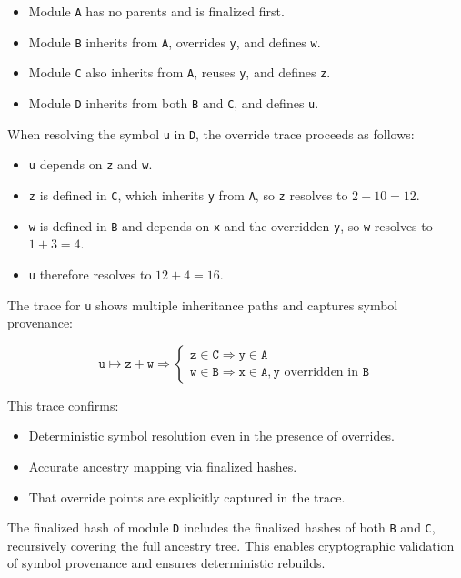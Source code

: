 \documentclass[sigplan,screen]{acmart}
\begin{document}
\begin{itemize}
	\item Module \texttt{A} has no parents and is finalized first.
	\item Module \texttt{B} inherits from \texttt{A}, overrides \texttt{y}, and defines \texttt{w}.
	\item Module \texttt{C} also inherits from \texttt{A}, reuses \texttt{y}, and defines \texttt{z}.
	\item Module \texttt{D} inherits from both \texttt{B} and \texttt{C}, and defines \texttt{u}.
\end{itemize}

When resolving the symbol \texttt{u} in \texttt{D}, the override trace proceeds as follows:

\begin{itemize}
	\item \texttt{u} depends on \texttt{z} and \texttt{w}.
	\item \texttt{z} is defined in \texttt{C}, which inherits \texttt{y} from \texttt{A}, so \texttt{z} resolves to $2 + 10 = 12$.
	\item \texttt{w} is defined in \texttt{B} and depends on \texttt{x} and the overridden \texttt{y}, so \texttt{w} resolves to $1 + 3 = 4$.
	\item \texttt{u} therefore resolves to $12 + 4 = 16$.
\end{itemize}

The trace for \texttt{u} shows multiple inheritance paths and captures symbol provenance:

\[
\texttt{u} \mapsto \texttt{z} + \texttt{w} \Rightarrow
\begin{cases}
	\texttt{z} \in \texttt{C} \Rightarrow \texttt{y} \in \texttt{A} \\
	\texttt{w} \in \texttt{B} \Rightarrow \texttt{x} \in \texttt{A}, \texttt{y} \text{ overridden in } \texttt{B}
\end{cases}
\]

This trace confirms:
\begin{itemize}
	\item Deterministic symbol resolution even in the presence of overrides.
	\item Accurate ancestry mapping via finalized hashes.
	\item That override points are explicitly captured in the trace.
\end{itemize}

The finalized hash of module \texttt{D} includes the finalized hashes of both \texttt{B} and \texttt{C}, recursively covering the full ancestry tree. This enables cryptographic validation of symbol provenance and ensures deterministic rebuilds.
\end{document}
